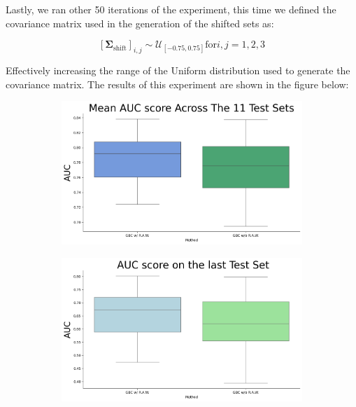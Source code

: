 Lastly, we ran other 50 iterations of the experiment, this time we defined the covariance matrix used in the generation of the shifted sets as:

$$
[\boldsymbol{\Sigma}_{\text{shift}}]_{i,j} \sim \mathcal{U}_{[-0.75,0.75]} \text{for} i, j = 1, 2, 3
$$

Effectively increasing the range of the Uniform distribution used to generate the covariance matrix. The results of this experiment are shown in the figure below:

\begin{figure}[H]
    \centering
    \begin{subfigure}{0.45\textwidth}
        \centering
        \includegraphics[width=\linewidth]{assets/1_075.png}
       
    \end{subfigure}
    \begin{subfigure}{0.45\textwidth}
        \centering
        \includegraphics[width=\linewidth]{assets/2_075.png}
       

\end{subfigure}
\end{figure}
